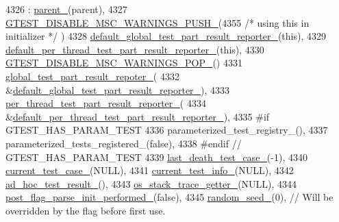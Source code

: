\begin{DoxyCode}
4326     : \hyperlink{classtesting_1_1internal_1_1UnitTestImpl_adabbbc8985202ce655d50746bd383eae}{parent\_}(parent),
4327       \hyperlink{gtest-port_8h_a86994cc68e844d8b82089c70408dfc61}{GTEST\_DISABLE\_MSC\_WARNINGS\_PUSH\_}(4355 \textcolor{comment}{/* using this in initializer */}
      )
4328       \hyperlink{classtesting_1_1internal_1_1UnitTestImpl_a645122eda4d8250f3e8139309510705e}{default\_global\_test\_part\_result\_reporter\_}(this),
4329       \hyperlink{classtesting_1_1internal_1_1UnitTestImpl_a261ddbea097ad3b43b8b510a4964f390}{default\_per\_thread\_test\_part\_result\_reporter\_}(this),
4330       \hyperlink{gtest-port_8h_ab4c44546d6d9aced68993b87b608fc06}{GTEST\_DISABLE\_MSC\_WARNINGS\_POP\_}()
4331       \hyperlink{classtesting_1_1internal_1_1UnitTestImpl_ab9a275094df6adc7e16a92133a692c3e}{global\_test\_part\_result\_repoter\_}(
4332           &\hyperlink{classtesting_1_1internal_1_1UnitTestImpl_a645122eda4d8250f3e8139309510705e}{default\_global\_test\_part\_result\_reporter\_}),
4333       \hyperlink{classtesting_1_1internal_1_1UnitTestImpl_a23ebe35dfe19dcda8e7b17e81f2cb4bc}{per\_thread\_test\_part\_result\_reporter\_}(
4334           &\hyperlink{classtesting_1_1internal_1_1UnitTestImpl_a261ddbea097ad3b43b8b510a4964f390}{default\_per\_thread\_test\_part\_result\_reporter\_}),
4335 \textcolor{preprocessor}{#if GTEST\_HAS\_PARAM\_TEST}
4336       parameterized\_test\_registry\_(),
4337       parameterized\_tests\_registered\_(\textcolor{keyword}{false}),
4338 \textcolor{preprocessor}{#endif  // GTEST\_HAS\_PARAM\_TEST}
4339       \hyperlink{classtesting_1_1internal_1_1UnitTestImpl_afd663a104bb0a6df2c5143454f78e305}{last\_death\_test\_case\_}(-1),
4340       \hyperlink{classtesting_1_1internal_1_1UnitTestImpl_a3b346729d3940f065e05c69c434ebb3f}{current\_test\_case\_}(NULL),
4341       \hyperlink{classtesting_1_1internal_1_1UnitTestImpl_a56128aac0fb5be45993715d1130b0610}{current\_test\_info\_}(NULL),
4342       \hyperlink{classtesting_1_1internal_1_1UnitTestImpl_a15355228a7140a08f9e2f333aa934ccd}{ad\_hoc\_test\_result\_}(),
4343       \hyperlink{classtesting_1_1internal_1_1UnitTestImpl_a16b34d9194ca9552f581e472e9b18494}{os\_stack\_trace\_getter\_}(NULL),
4344       \hyperlink{classtesting_1_1internal_1_1UnitTestImpl_ab4c7d8a9ff3edbd8a98f91c4afaf3bb8}{post\_flag\_parse\_init\_performed\_}(\textcolor{keyword}{false}),
4345       \hyperlink{classtesting_1_1internal_1_1UnitTestImpl_a0afcc95308ebfacb8d0f53790e77e1ab}{random\_seed\_}(0),  \textcolor{comment}{// Will be overridden by the flag before first use.}

\end{DoxyCode}
